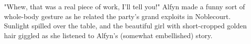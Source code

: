 "Whew, that was a real piece of work, I'll tell you!" Alfyn made a funny sort of whole-body gesture as he related the party's grand exploits in Noblecourt. Sunlight spilled over the table, and the beautiful girl with short-cropped golden hair giggled as she listened to Alfyn's (somewhat embellished) story.
